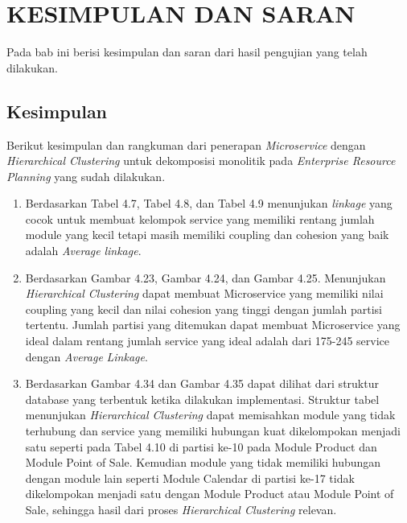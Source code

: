 \chapter{KESIMPULAN DAN SARAN}

\vspace{4.5pt}
Pada bab ini berisi kesimpulan dan saran dari hasil pengujian yang telah dilakukan.  


\section{Kesimpulan}
Berikut kesimpulan dan rangkuman dari penerapan \textit{Microservice} dengan \textit{Hierarchical Clustering} untuk dekomposisi monolitik pada \textit{Enterprise Resource Planning} yang sudah dilakukan.

\begin{enumerate}[nolistsep,leftmargin=0.5cm]
    \item Berdasarkan Tabel 4.7,  Tabel 4.8, dan Tabel 4.9 menunjukan \textit{linkage} yang cocok untuk membuat kelompok service yang memiliki rentang jumlah module yang kecil tetapi masih memiliki coupling dan cohesion yang baik adalah \textit{Average} \textit{linkage}.
    \item Berdasarkan Gambar 4.23, Gambar 4.24,  dan Gambar 4.25. Menunjukan \textit{Hierarchical Clustering} dapat membuat Microservice yang memiliki nilai coupling yang kecil dan nilai cohesion yang tinggi dengan jumlah partisi tertentu. Jumlah partisi yang ditemukan dapat membuat Microservice yang ideal dalam rentang jumlah service yang ideal adalah dari 175-245 service dengan \textit{Average} \textit{Linkage}. 
    \item Berdasarkan Gambar 4.34  dan Gambar 4.35 dapat dilihat dari struktur database yang terbentuk ketika dilakukan implementasi. Struktur tabel menunjukan \textit{Hierarchical Clustering} dapat memisahkan module yang tidak terhubung dan service yang memiliki hubungan kuat dikelompokan menjadi satu seperti pada Tabel 4.10 di partisi ke-10 pada Module Product dan Module Point of Sale. Kemudian module yang tidak memiliki hubungan dengan module lain seperti Module Calendar di partisi ke-17 tidak dikelompokan menjadi satu dengan Module Product atau Module Point of Sale, sehingga hasil dari proses \textit{Hierarchical Clustering} relevan.\\
\end{enumerate}

